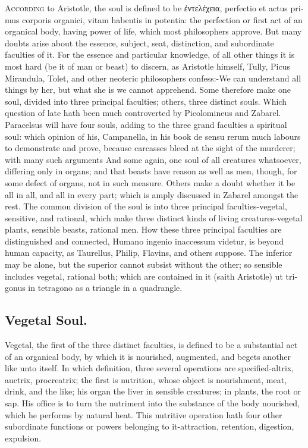 {\lettrine{A}{ccording} to Aristotle, the soul is defined to be \textgreek{ἐντελέχεια},
\textlatin{perfectio et actus primus corporis organici, vitam habentis in
potentia}: the perfection or first act of an organical body, having
power of life, which most philosophers approve. But many doubts
arise about the essence, subject, seat, distinction, and subordinate
faculties of it. For the essence and particular knowledge, of all other
things it is most hard (be it of man or beast) to discern, as
Aristotle himself, Tully, Picus Mirandula, Tolet,
and other neoteric philosophers confess:-We can understand all
things by her, but what she is we cannot apprehend. Some therefore make
one soul, divided into three principal faculties; others, three
distinct souls. Which question of late hath been much controverted by
Picolomineus and Zabarel.  Paracelsus will have four souls, adding
to the three grand faculties a spiritual soul: which opinion of his,
Campanella, in his book de sensu rerum much labours to demonstrate
and prove, because carcasses bleed at the sight of the murderer; with
many such arguments And some again, one soul of all creatures
whatsoever, differing only in organs; and that beasts have reason as
well as men, though, for some defect of organs, not in such measure.
Others make a doubt whether it be all in all, and all in every part;
which is amply discussed in Zabarel amongst the rest. The common
division of the soul is into three principal faculties-vegetal,
sensitive, and rational, which make three distinct kinds of living
creatures-vegetal plants, sensible beasts, rational men. How these
three principal faculties are distinguished and connected, Humano
ingenio inaccessum videtur, is beyond human capacity, as 
Taurellus, Philip, Flavins, and others suppose. The inferior may be
alone, but the superior cannot subsist without the other; so sensible
includes vegetal, rational both; which are contained in it (saith
Aristotle) \textlatin{ut trigonus in tetragono} as a triangle in a quadrangle.
\subsection{Vegetal Soul.}
Vegetal, the first of the three distinct faculties, is
defined to be a substantial act of an organical body, by which it is
nourished, augmented, and begets another like unto itself. In which
definition, three several operations are specified-altrix, auctrix,
procreatrix; the first is nutrition, whose object is nourishment,
meat, drink, and the like; his organ the liver in sensible creatures;
in plants, the root or sap. His office is to turn the nutriment into
the substance of the body nourished, which he performs by natural heat.
This nutritive operation hath four other subordinate functions or
powers belonging to it-attraction, retention, digestion, expulsion.
}
